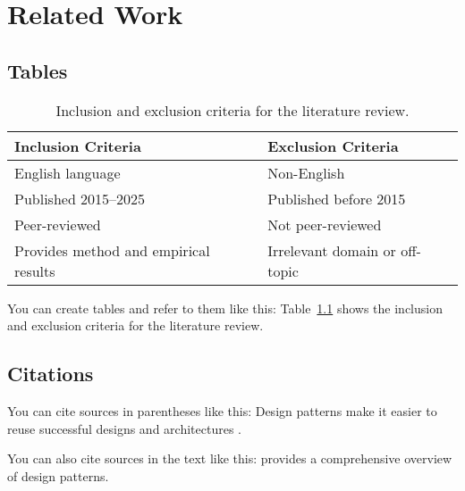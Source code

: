 \chapter{Related Work}
\label{chap:related-work}

\section{Tables}

\begin{table}[htbp]
    \centering
    \caption{Inclusion and exclusion criteria for the literature review.}
    \label{table:review-criteria}
    \begin{tabularx}{1.0\textwidth}{>{\raggedright\arraybackslash}X>{\raggedright\arraybackslash}X}
        \toprule
        \textbf{Inclusion Criteria}           & \textbf{Exclusion Criteria}    \\
        \midrule
        English language                      & Non-English                    \\
        Published 2015–2025                   & Published before 2015          \\
        Peer-reviewed                         & Not peer-reviewed              \\
        Provides method and empirical results & Irrelevant domain or off-topic \\
        \bottomrule
    \end{tabularx}
\end{table}

You can create tables and refer to them like this: Table~\ref{table:review-criteria} shows the inclusion and exclusion criteria for the literature review.

\section{Citations}

You can cite sources in parentheses like this: Design patterns make it easier to reuse successful designs and architectures \autocite{gamma1994design}.

You can also cite sources in the text like this: \textcite{gamma1994design} provides a comprehensive overview of design patterns.
